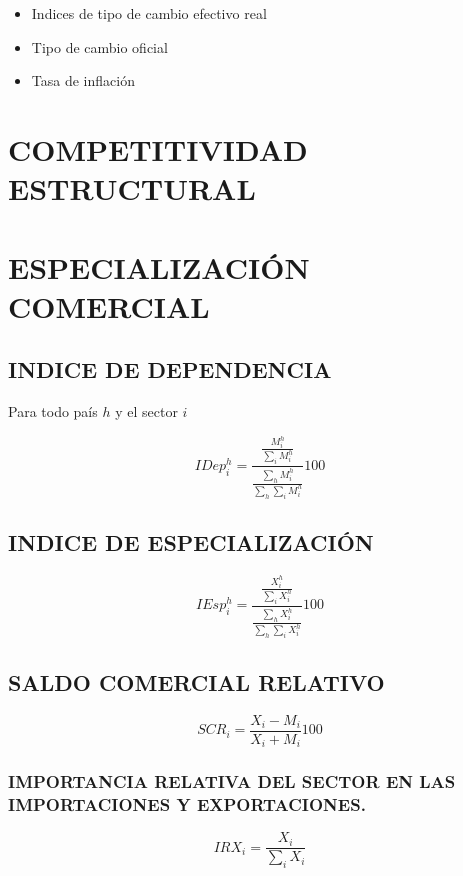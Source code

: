 \documentclass[12pt]{book}
\providecommand{\tightlist}{%
      \setlength{\itemsep}{0pt}\setlength{\parskip}{0pt}}
\begin{document}
\begin{itemize}
\tightlist
\item
  Indices de tipo de cambio efectivo real
\item
  Tipo de cambio oficial
\item
  Tasa de inflación
\end{itemize}

\chapter{COMPETITIVIDAD ESTRUCTURAL}\label{competitividad-estructural}

\chapter{ESPECIALIZACIÓN COMERCIAL}\label{especializaciuxf3n-comercial}

\section{INDICE DE DEPENDENCIA}\label{indice-de-dependencia}

Para todo país \(h\) y el sector \(i\)

\[IDep^h_i = \frac{\frac{M^h_i}{\sum_i M^h_i}}{\frac{\sum_h M^h_i}{\sum_h \sum_i M^h_i}} 100\]

\section{INDICE DE
ESPECIALIZACIÓN}\label{indice-de-especializaciuxf3n}

\[IEsp^h_i = \frac{\frac{X^h_i}{\sum_i X^h_i}}{\frac{\sum_h X^h_i}{\sum_h \sum_i X^h_i}} 100\]

\section{SALDO COMERCIAL RELATIVO}\label{saldo-comercial-relativo}

\[SCR_i = \frac{X_i - M_i}{X_i + M_i} 100\]

\subsection{IMPORTANCIA RELATIVA DEL SECTOR EN LAS IMPORTACIONES Y
EXPORTACIONES.}\label{importancia-relativa-del-sector-en-las-importaciones-y-exportaciones.}

\[IRX_i = \frac{X_i}{\sum_i X_i}\]
\end{document}
